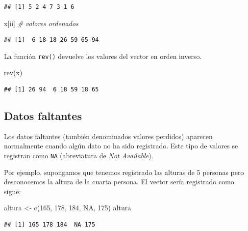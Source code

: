 \documentclass[
]{book}
\newenvironment{Shaded}{\begin{snugshade}}{\end{snugshade}}
\newcommand{\CommentTok}[1]{\textcolor[rgb]{0.56,0.35,0.01}{\textit{#1}}}
\newcommand{\ConstantTok}[1]{\textcolor[rgb]{0.00,0.00,0.00}{#1}}
\newcommand{\DecValTok}[1]{\textcolor[rgb]{0.00,0.00,0.81}{#1}}
\newcommand{\FunctionTok}[1]{\textcolor[rgb]{0.00,0.00,0.00}{#1}}
\newcommand{\NormalTok}[1]{#1}
\newcommand{\OtherTok}[1]{\textcolor[rgb]{0.56,0.35,0.01}{#1}}
\theoremstyle{break}
\theoremstyle{nonumberplain}
\begin{document}
\begin{verbatim}
## [1] 5 2 4 7 3 1 6
\end{verbatim}

\begin{Shaded}
\begin{Highlighting}[]
\NormalTok{x[ii]  }\CommentTok{\# valores ordenados}
\end{Highlighting}
\end{Shaded}

\begin{verbatim}
## [1]  6 18 18 26 59 65 94
\end{verbatim}

La función \texttt{rev()} devuelve los valores del vector en orden inverso.

\begin{Shaded}
\begin{Highlighting}[]
\FunctionTok{rev}\NormalTok{(x)}
\end{Highlighting}
\end{Shaded}

\begin{verbatim}
## [1] 26 94  6 18 59 18 65
\end{verbatim}

\hypertarget{datos-faltantes}{%
\subsection{Datos faltantes}\label{datos-faltantes}}

Los datos faltantes (también denominados valores perdidos) aparecen normalmente cuando algún dato no ha sido registrado.
Este tipo de valores se registran como \texttt{NA} (abreviatura de \emph{Not Available}).

Por ejemplo, supongamos que tenemos registrado las alturas de 5 personas pero desconocemos la altura de la cuarta persona.
El vector sería registrado como sigue:

\begin{Shaded}
\begin{Highlighting}[]
\NormalTok{altura }\OtherTok{\textless{}{-}} \FunctionTok{c}\NormalTok{(}\DecValTok{165}\NormalTok{, }\DecValTok{178}\NormalTok{, }\DecValTok{184}\NormalTok{, }\ConstantTok{NA}\NormalTok{, }\DecValTok{175}\NormalTok{)}
\NormalTok{altura}
\end{Highlighting}
\end{Shaded}

\begin{verbatim}
## [1] 165 178 184  NA 175
\end{verbatim}
\end{document}
